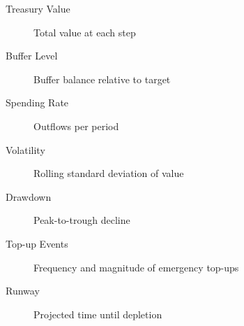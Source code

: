 \begin{description}
    \item[Treasury Value] Total value at each step
    \item[Buffer Level] Buffer balance relative to target
    \item[Spending Rate] Outflows per period
    \item[Volatility] Rolling standard deviation of value
    \item[Drawdown] Peak-to-trough decline
    \item[Top-up Events] Frequency and magnitude of emergency top-ups
    \item[Runway] Projected time until depletion
\end{description}
